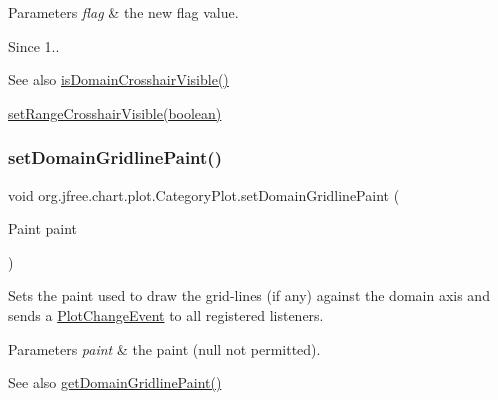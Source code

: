 \begin{DoxyParams}{Parameters}
{\em flag} & the new flag value.\\
\hline
\end{DoxyParams}
\begin{DoxySince}{Since}
1..
\end{DoxySince}
\begin{DoxySeeAlso}{See also}
\mbox{\hyperlink{classorg_1_1jfree_1_1chart_1_1plot_1_1_category_plot_ac2a9090ae1a302480897d3383773b168}{is\+Domain\+Crosshair\+Visible()}} 

\mbox{\hyperlink{classorg_1_1jfree_1_1chart_1_1plot_1_1_category_plot_a885d7f1c76a50bbd6c131e014fe917a5}{set\+Range\+Crosshair\+Visible(boolean)}} 
\end{DoxySeeAlso}
\mbox{\label{classorg_1_1jfree_1_1chart_1_1plot_1_1_category_plot_ad40d88e79916f70d4b3f52905440c941}} 
\subsubsection{\texorpdfstring{set\+Domain\+Gridline\+Paint()}{setDomainGridlinePaint()}}
{\footnotesize\ttfamily void org.\+jfree.\+chart.\+plot.\+Category\+Plot.\+set\+Domain\+Gridline\+Paint (\begin{DoxyParamCaption}\item[{Paint}]{paint }\end{DoxyParamCaption})}

Sets the paint used to draw the grid-\/lines (if any) against the domain axis and sends a \mbox{\hyperlink{}{Plot\+Change\+Event}} to all registered listeners.


\begin{DoxyParams}{Parameters}
{\em paint} & the paint ({\ttfamily null} not permitted).\\
\hline
\end{DoxyParams}
\begin{DoxySeeAlso}{See also}
\mbox{\hyperlink{classorg_1_1jfree_1_1chart_1_1plot_1_1_category_plot_a6fb5fd2f2f6b005667d2b0787385e5ae}{get\+Domain\+Gridline\+Paint()}} 
\end{DoxySeeAlso}
\mbox{\label{classorg_1_1jfree_1_1chart_1_1plot_1_1_category_plot_a3a98acbf2d67788bfd36f4e9fa1c2c67}} 
